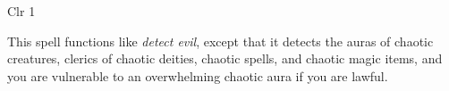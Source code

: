 
\begin{description*}
\item[Level:] Clr 1
\end{description*}

This spell functions like \textit{detect evil}, except that it detects the auras
of chaotic creatures, clerics of chaotic deities, chaotic spells, and chaotic magic
items, and you are vulnerable to an overwhelming chaotic aura if you are lawful.